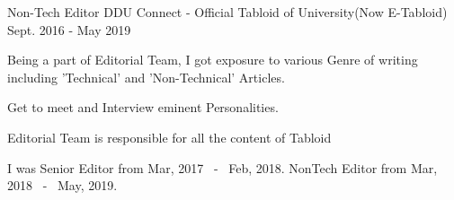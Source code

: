 


\begin{cventries}


\cventry
{Non-Tech Editor} %
{DDU Connect - Official Tabloid of University(Now E-Tabloid)} %
{Sept. 2016 - May 2019} %
{} %
{ %
\begin{cvitems}
\item {Being a part of Editorial Team, I got exposure to various Genre of writing including 'Technical' and 'Non-Technical' Articles.}
\item {Get to meet and Interview eminent Personalities.}
\item {Editorial Team is responsible for all the content of Tabloid}
\item {I was Senior Editor from Mar, 2017 ~-~ Feb, 2018. NonTech Editor from Mar, 2018 ~-~ May, 2019.}
\end{cvitems}
}






\end{cventries}
